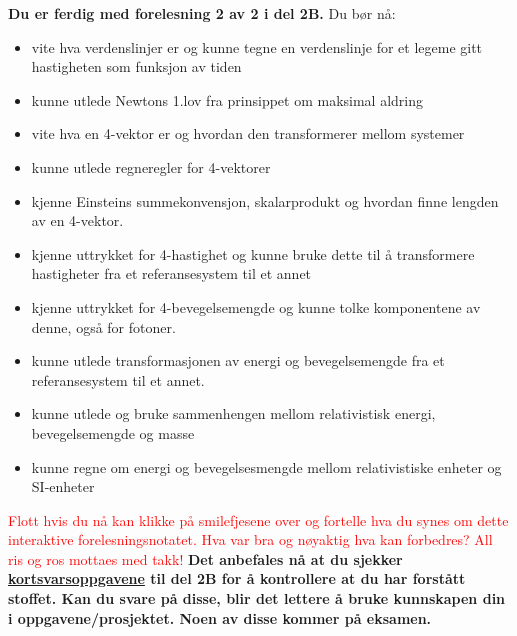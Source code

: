 \documentclass{beamer}
\let\hrefori\href
\renewcommand{\href}[2]{{\setlength{\fboxsep}{1pt}\colorbox{sunset}{\hrefori{#1}{#2}}}}
\newcommand{\pagebutton}[1]{\setbeamertemplate{button}{\tikz\node[inner xsep = 5pt, draw = structure!90, fill = green(ryb), rounded corners = 8pt]{\color{amber}\Large\insertbuttontext};}\beamerbutton{#1}}
\begin{document}
\begin{frame}
\label{oppsummering}
\hyperlink{pe20}{\pagebutton{\small Forrige side}}\href{https://nettskjema.no/a/171403}{ \Changey[1][yellow]{-2}}
{\tiny
{\bf Du er ferdig med forelesning 2 av 2 i del 2B.} Du bør nå:
\begin{itemize}
\item vite hva verdenslinjer er og kunne tegne en verdenslinje for et legeme gitt hastigheten som funksjon av tiden
\item kunne utlede Newtons 1.lov fra prinsippet om maksimal aldring
\item vite hva en 4-vektor er og hvordan den transformerer mellom systemer
\item kunne utlede regneregler for 4-vektorer
\item kjenne Einsteins summekonvensjon, skalarprodukt og hvordan finne lengden av en 4-vektor.
\item kjenne uttrykket for 4-hastighet og kunne bruke dette til å transformere hastigheter fra et referansesystem til et annet
\item kjenne uttrykket for 4-bevegelsemengde og kunne tolke komponentene av denne, også for fotoner.
\item kunne utlede transformasjonen av energi og bevegelsemengde fra et referansesystem til et annet.
\item kunne utlede og bruke sammenhengen mellom relativistisk energi, bevegelsemengde og masse
\item kunne regne om energi og bevegelsesmengde mellom relativistiske enheter og SI-enheter
\end{itemize}
\textcolor{red}{Flott hvis du nå kan klikke på smilefjesene over og fortelle hva du synes om dette interaktive forelesningsnotatet. Hva var bra og nøyaktig hva kan forbedres? All ris og ros mottaes med takk!} {\bf Det anbefales nå at du sjekker \href{https://www.uio.no/studier/emner/matnat/astro/AST2000/h21/undervisningsmateriell/kortsvarsoppgaver/del2b.pdf}{kortsvarsoppgavene} til del 2B for å kontrollere at du har forstått stoffet. Kan du svare på disse, blir det lettere å bruke kunnskapen din i oppgavene/prosjektet. Noen av disse kommer på eksamen.}
}
\end{frame}
\end{document}
